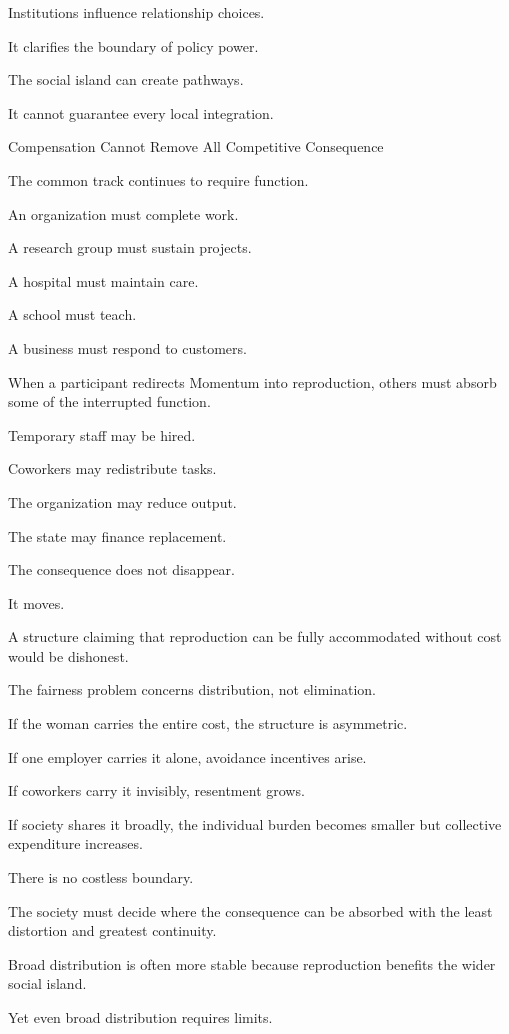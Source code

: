 Institutions influence relationship choices.

It clarifies the boundary of policy power.

The social island can create pathways.

It cannot guarantee every local integration.

Compensation Cannot Remove All Competitive Consequence

The common track continues to require function.

An organization must complete work.

A research group must sustain projects.

A hospital must maintain care.

A school must teach.

A business must respond to customers.

When a participant redirects Momentum into reproduction, others must absorb some of the interrupted function.

Temporary staff may be hired.

Coworkers may redistribute tasks.

The organization may reduce output.

The state may finance replacement.

The consequence does not disappear.

It moves.

A structure claiming that reproduction can be fully accommodated without cost would be dishonest.

The fairness problem concerns distribution, not elimination.

If the woman carries the entire cost, the structure is asymmetric.

If one employer carries it alone, avoidance incentives arise.

If coworkers carry it invisibly, resentment grows.

If society shares it broadly, the individual burden becomes smaller but collective expenditure increases.

There is no costless boundary.

The society must decide where the consequence can be absorbed with the least distortion and greatest continuity.

Broad distribution is often more stable because reproduction benefits the wider social island.

Yet even broad distribution requires limits.

